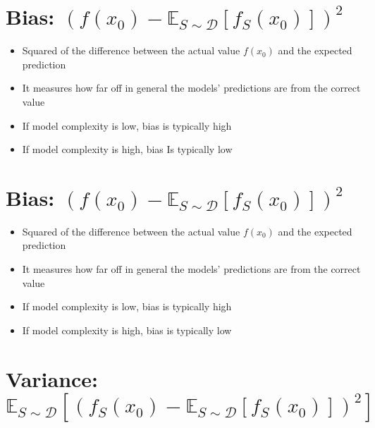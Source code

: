 \section*{Bias: $\left(f\left(x_{0}\right)-\mathbb{E}_{S \sim \mathscr{D}}\left[f_{S}\left(x_{0}\right)\right]\right)^{2}$}

\begin{itemize}
  \item Squared of the difference between the actual value $f\left(x_{0}\right)$ and the expected prediction

  \item It measures how far off in general the models' predictions are from the correct value

  \item If model complexity is low, bias is typically high

  \item If model complexity is high, bias Is typically low

\end{itemize}

\section*{Bias: $\left(f\left(x_{0}\right)-\mathbb{E}_{S \sim \mathscr{D}}\left[f_{S}\left(x_{0}\right)\right]\right)^{2}$}

\begin{itemize}
  \item Squared of the difference between the actual value $f\left(x_{0}\right)$ and the expected prediction

  \item It measures how far off in general the models' predictions are from the correct value

  \item If model complexity is low, bias is typically high

  \item If model complexity is high, bias is typically low

\end{itemize}

\section*{Variance: $\mathbb{E}_{S \sim \mathscr{D}}\left[\left(f_{S}\left(x_{0}\right)-\mathbb{E}_{S \sim \mathscr{D}}\left[f_{S}\left(x_{0}\right)\right]\right)^{2}\right]$}

